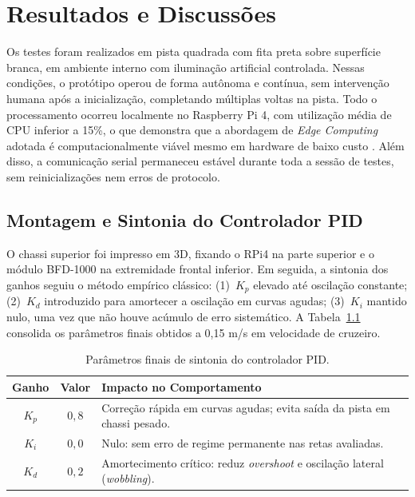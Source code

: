 \chapter{Resultados e Discussões}

Os testes foram realizados em pista quadrada com fita preta sobre superfície branca, em ambiente interno com iluminação artificial controlada. Nessas condições, o protótipo operou de forma autônoma e contínua, sem intervenção humana após a inicialização, completando múltiplas voltas na pista. Todo o processamento ocorreu localmente no Raspberry Pi 4, com utilização média de CPU inferior a 15\%, o que demonstra que a abordagem de \textit{Edge Computing} adotada é computacionalmente viável mesmo em hardware de baixo custo \cite{rpi4, rpi_network_throughput}. Além disso, a comunicação serial permaneceu estável durante toda a sessão de testes, sem reinicializações nem erros de protocolo.

\section{Montagem e Sintonia do Controlador PID}
\label{sec:resultados_pid}

O chassi superior foi impresso em 3D, fixando o RPi4 na parte superior e o módulo BFD-1000 na extremidade frontal inferior. Em seguida, a sintonia dos ganhos seguiu o método empírico clássico: (1)~$K_p$ elevado até oscilação constante; (2)~$K_d$ introduzido para amortecer a oscilação em curvas agudas; (3)~$K_i$ mantido nulo, uma vez que não houve acúmulo de erro sistemático. A Tabela~\ref{tab:pid_tuning} consolida os parâmetros finais obtidos a 0{,}15 m/s em velocidade de cruzeiro.

\begin{table}[H]
    \centering
    \caption{Parâmetros finais de sintonia do controlador PID.}
    \label{tab:pid_tuning}
    \small
    \begin{tabular}{|c|c|p{7cm}|}
        \hline
        \textbf{Ganho} & \textbf{Valor} & \textbf{Impacto no Comportamento} \\ \hline
        $K_p$ & $0{,}8$ & Correção rápida em curvas agudas; evita saída da pista em chassi pesado. \\ \hline
        $K_i$ & $0{,}0$ & Nulo: sem erro de regime permanente nas retas avaliadas. \\ \hline
        $K_d$ & $0{,}2$ & Amortecimento crítico: reduz \textit{overshoot} e oscilação lateral (\textit{wobbling}). \\ \hline
    \end{tabular}
\end{table}

